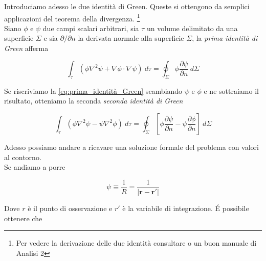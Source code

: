 Introduciamo adesso le due identità di Green. Queste si ottengono da semplici applicazioni del teorema della divergenza. \footnote{Per vedere la derivazione delle due identità consultare \cite{ElettrodinamicaClassica} o un buon manuale di Analisi 2} \\

Siano  $\phi$ e $\psi$ due campi scalari arbitrari, sia $\tau$ un volume delimitato da una superficie $\Sigma$ e sia $\partial / \partial n$ la derivata normale alla superficie $\Sigma$, la \emph{prima identità di Green} afferma

\begin{tcolorbox}[colback=yellow!10!white, colframe=orange!70!black, boxrule=0.8pt]
\begin{equation}
    \int _{\tau} (\phi \nabla^2 \psi + \nabla \phi \cdot \nabla \psi) \ d\tau = \oint _{\Sigma} \phi \frac{\partial \psi}{\partial n} \ d\Sigma 
    \label{eq:prima_identità_Green}
\end{equation}
\end{tcolorbox}

Se riscriviamo  la \ref{eq:prima_identità_Green} scambiando $\psi$ e $\phi$ e ne sottraiamo il risultato, otteniamo la seconda \emph{seconda identità di Green}

\begin{tcolorbox}[colback=yellow!10!white, colframe=orange!70!black, boxrule=0.8pt]
\begin{equation}
    \int_{\tau} (\phi \nabla^2 \psi - \psi \nabla^2 \phi) \ d \tau =\oint_{\Sigma} \left [ \phi \frac{\partial \psi}{\partial n} - \psi \frac{\partial \phi}{\partial n} \right ] \ d \Sigma
    \label{eq:seconda_identità_Green}
\end{equation}
\end{tcolorbox}

\newpage

Adesso possiamo andare a ricavare una soluzione formale del problema con valori al contorno.\\

Se andiamo a porre 

\begin{equation}
    \psi \equiv \frac{1}{R} = \frac{1}{|\mathbf{r} - \mathbf{r'}|}
\end{equation}

Dove $r$ è il punto di osservazione e $r'$ è la variabile di integrazione. \' E possibile ottenere che 

